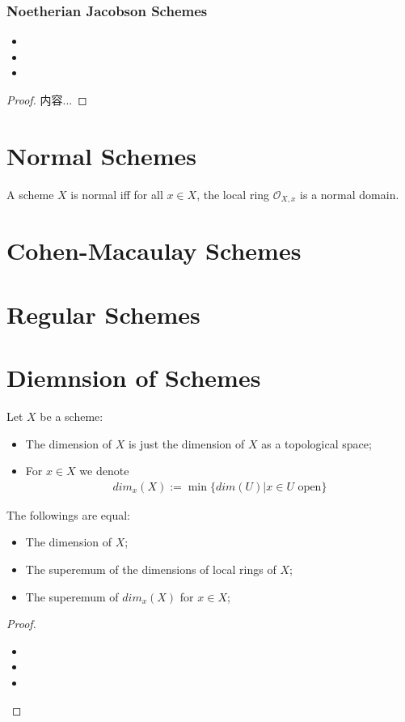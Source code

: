 \documentclass[Total.tex]{subfiles}
\begin{document}
			\subsubsection{Noetherian Jacobson Schemes}
			\begin{lemma}
				\begin{itemize}
					\item 
					\item 
					\item 
				\end{itemize}
			\end{lemma}
			\begin{proof}
				内容...
			\end{proof}
		\section{Normal Schemes}
			\begin{Def}
				A scheme $X$ is normal iff for all $x\in X$, the local ring $\mathcal{O}_{X,x}$ is a normal domain.
			\end{Def}
		\section{Cohen-Macaulay Schemes}
		\section{Regular Schemes}
		\section{Diemnsion of Schemes}
			\begin{Def}
				Let $X$ be a scheme:
				\begin{itemize}
					\item The dimension of $X$ is just the dimension of $X$ as a topological space;
					\item For $x\in X$ we denote 
					\begin{gather*}
						dim_x(X):=\min\{dim(U)|x\in U\mbox{ open}\}
					\end{gather*}
				\end{itemize}
			\end{Def}
			
			\begin{lemma}
				The followings are equal:
				\begin{itemize}
					\item The dimension of $X$;
					\item The superemum of the dimensions of local rings of $X$;
					\item The superemum of $dim_x(X)$ for $x\in X$;
				\end{itemize}
			\end{lemma}
			\begin{proof}
				\begin{itemize}
					\item 
					\item 
					\item 
				\end{itemize}
			\end{proof}
			
\end{document}
